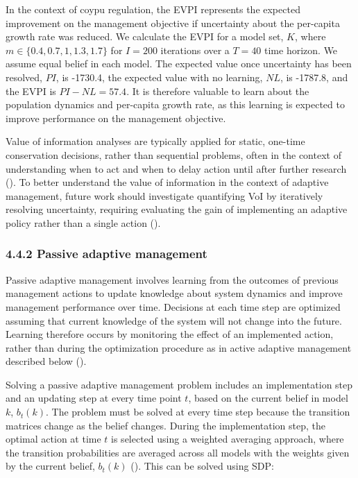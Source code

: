 \documentclass[
  11pt,
  a4paper,
]{article}
\begin{document}
In the context of coypu regulation, the EVPI represents the expected improvement on the management objective if uncertainty about the per-capita growth rate was reduced. We calculate the EVPI for a model set, \(K\), where \(m \in \{0.4, 0.7, 1, 1.3, 1.7\}\) for \(I = 200\) iterations over a \(T = 40\) time horizon. We assume equal belief in each model. The expected value once uncertainty has been resolved, \(PI\), is -1730.4, the expected value with no learning, \(NL\), is -1787.8, and the EVPI is \(PI - NL = 57.4\). It is therefore valuable to learn about the population dynamics and per-capita growth rate, as this learning is expected to improve performance on the management objective.

Value of information analyses are typically applied for static, one-time conservation decisions, rather than sequential problems, often in the context of understanding when to act and when to delay action until after further research (). To better understand the value of information in the context of adaptive management, future work should investigate quantifying VoI by iteratively resolving uncertainty, requiring evaluating the gain of implementing an adaptive policy rather than a single action ().

\subsubsection{4.4.2 Passive adaptive management}\label{passive-adaptive-management}

Passive adaptive management involves learning from the outcomes of previous management actions to update knowledge about system dynamics and improve management performance over time. Decisions at each time step are optimized assuming that current knowledge of the system will not change into the future. Learning therefore occurs by monitoring the effect of an implemented action, rather than during the optimization procedure as in active adaptive management described below ().

Solving a passive adaptive management problem includes an implementation step and an updating step at every time point \(t\), based on the current belief in model \(k\), \(b_t(k)\). The problem must be solved at every time step because the transition matrices change as the belief changes. During the implementation step, the optimal action at time \(t\) is selected using a weighted averaging approach, where the transition probabilities are averaged across all models with the weights given by the current belief, \(b_t(k)\) (). This can be solved using SDP:
\end{document}
